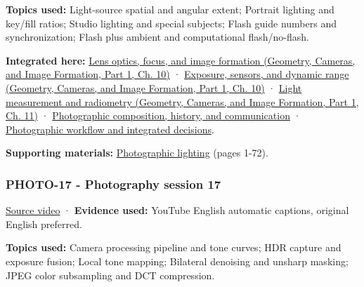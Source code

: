 \textbf{Topics used:} Light-source spatial and angular extent; Portrait lighting and key/fill ratios; Studio lighting and special subjects; Flash guide numbers and synchronization; Flash plus ambient and computational flash/no-flash.

\textbf{Integrated here:} \href{../03-Geometry-Cameras-and-Image-Formation-P01/main.pdf\#03-visual-computing-i-ch003-lens-optics-focus-and-image-formation}{Lens optics, focus, and image formation (Geometry, Cameras, and Image Formation, Part 1, Ch. 10)} · \href{../03-Geometry-Cameras-and-Image-Formation-P01/main.pdf\#03-visual-computing-i-ch003-exposure-sensors-and-dynamic-range}{Exposure, sensors, and dynamic range (Geometry, Cameras, and Image Formation, Part 1, Ch. 10)} · \href{../03-Geometry-Cameras-and-Image-Formation-P01/main.pdf\#03-visual-computing-i-ch004-light-measurement-and-radiometry}{Light measurement and radiometry (Geometry, Cameras, and Image Formation, Part 1, Ch. 11)} · \hyperref[04-visual-computing-ii-ch034-photographic-composition-history-and-communication]{Photographic composition, history, and communication} · \hyperref[04-visual-computing-ii-ch034-photographic-workflow-and-integrated-decisions]{Photographic workflow and integrated decisions}.

\textbf{Supporting materials:} \href{https://drive.google.com/open?id=0B6w2XfPHEcZYN1dYTWZndkZDNVE}{Photographic lighting} (pages 1-72).

\subsubsection{PHOTO-17 - Photography session 17}\label{04-visual-computing-ii-ch036-photo-17---photography-session-17}

\hypertarget{04-visual-computing-ii-ch036-photo-17---photography-session-17}{}

\href{https://www.youtube.com/watch?v=Jb4ojXL3xcA}{Source video} · \textbf{Evidence used:} YouTube English automatic captions, original English preferred.

\textbf{Topics used:} Camera processing pipeline and tone curves; HDR capture and exposure fusion; Local tone mapping; Bilateral denoising and unsharp masking; JPEG color subsampling and DCT compression.

